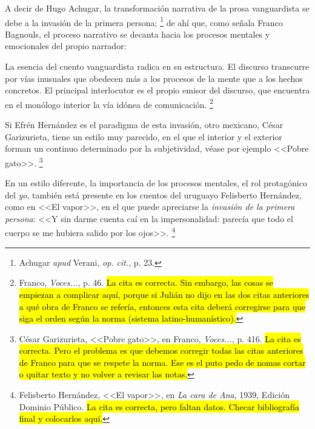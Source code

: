 \documentclass[14pt,twoside,final]{extbook} %
\let\oldfootnote\footnote
\renewcommand\footnote[1]{%
\oldfootnote{\hspace{1mm}#1}}
\begin{document}
A decir de Hugo Achugar, la transformación narrativa de la prosa vanguardista se debe a la invasión de la primera persona;\footnote{Achugar \emph{apud} Verani, \emph{op. cit.}, p. 23.} de ahí que, como señala Franco Bagnouls, el proceso narrativo se decanta hacia los procesos mentales y emocionales del propio narrador:
\begin{quoting}
La esencia del cuento vanguardista radica en su estructura. El discurso transcurre por vías inusuales que obedecen más a los procesos de la mente que a los hechos concretos.  El principal interlocutor es el propio emisor del discurso, que encuentra en el monólogo interior la vía idónea de comunicación.\footnote{Franco, \emph{Voces...}, p. 46. \hl{La cita es correcta. Sin embargo, las cosas se empiezan a complicar aquí, porque si Julián no dijo en las dos citas anteriores a qué obra de Franco se refería, entonces esta cita deberá corregirse para que siga el orden según la norma (sistema latino-humanístico).}}
\end{quoting}
Si Efrén Hernández es el paradigma de esta invasión, otro mexicano, César Garizurieta, tiene un estilo muy parecido, en el que el interior y el exterior forman un continuo determinado por la subjetividad, véase por ejemplo <<Pobre gato>>.\footnote{César Garizurieta, <<Pobre gato>>, en Franco, \emph{Voces...}, p. 416. \hl{La cita es correcta. Pero el problema es que debemos corregir todas las citas anteriores de Franco para que se respete la norma. Ese es el puto pedo de nomas cortar o quitar texto y no volver a revisar las notas.}}

En un estilo diferente, la importancia de los procesos mentales, el rol
protagónico del \emph{yo}, también está presente en los cuentos del uruguayo Felisberto Hernández, como en <<El vapor>>, en el que puede apreciarse la \emph{invasión de la primera persona}: <<Y sin darme cuenta caí en la impersonalidad: parecía que todo el cuerpo se me hubiera salido por los ojos>>.\footnote{Felisberto Hernández, <<El vapor>>, en \emph{La cara de Ana}, 1939, Edición Dominio Público. \hl{La cita es correcta, pero faltan datos. Checar bibliografía final y colocarlos aquí.}}
\end{document}
